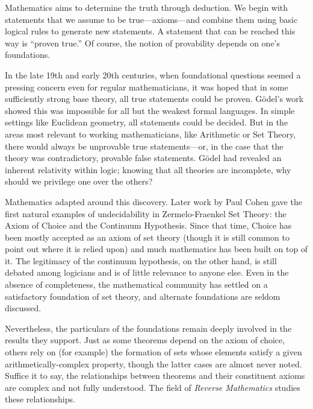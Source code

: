 \documentclass{amsart}
\begin{document}
	{
		Mathematics aims to determine the truth through deduction. We begin with statements that we assume to be true---axioms---and combine them using basic logical rules to generate new statements. A statement that can be reached this way is ``proven true.'' Of course, the notion of provability depends on one's foundations. 
		
		In the late 19th and early 20th centuries, when foundational questions seemed a pressing concern even for regular mathematicians, it was hoped that in some sufficiently strong base theory, all true statements could be proven. G\"odel's work showed this was impossible for all but the weakest formal languages. In simple settings like Euclidean geometry, all statements could be decided. But in the areas most relevant to working mathematicians, like Arithmetic or Set Theory, there would always be unprovable true statements---or, in the case that the theory was contradictory, provable false statements. G\"odel had revealed an inherent relativity within logic; knowing that all theories are incomplete, why should we privilege one over the others?
		
		
		Mathematics adapted around this discovery. Later work by Paul Cohen gave the first natural examples of undecidability in Zermelo-Fraenkel Set Theory: the Axiom of Choice and the Continuum Hypothesis. Since that time, Choice has been mostly accepted as an axiom of set theory (though it is still common to point out where it is relied upon) and much mathematics has been built on top of it. The legitimacy of the continuum hypothesis, on the other hand, is still debated among logicians and is of little relevance to anyone else. Even in the absence of completeness, the mathematical community has settled on a satisfactory foundation of set theory, and alternate foundations are seldom discussed.
		
		Nevertheless, the particulars of the foundations remain deeply involved in the results they support. Just as some theorems depend on the axiom of choice, others rely on (for example)
		the formation of sets whose elements satisfy a given arithmetically-complex property,
		though the latter cases are almost never noted. Suffice it to say, the relationships between theorems and their constituent axioms are complex and not fully understood. The field of \textit{Reverse Mathematics} studies these relationships.\\
		
}
\end{document}
